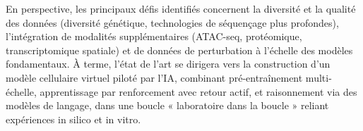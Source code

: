 En perspective, les principaux défis identifiés concernent la diversité et la qualité des données (diversité génétique, technologies de séquençage plus profondes), l'intégration de modalités supplémentaires (ATAC-seq, protéomique, transcriptomique spatiale) et de données de perturbation à l'échelle des modèles fondamentaux. À terme, l'état de l'art se dirigera vers la construction d'un modèle cellulaire virtuel piloté par l'IA, combinant pré-entraînement multi-échelle, apprentissage par renforcement avec retour actif, et raisonnement via des modèles de langage, dans une boucle « laboratoire dans la boucle » reliant expériences in silico et in vitro.
